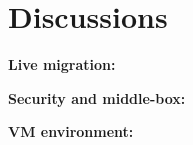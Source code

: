 \section{Discussions} \label{sec:discussion}


\textbf{Live migration:} 

\textbf{Security and middle-box:} 

\textbf{VM environment:}

